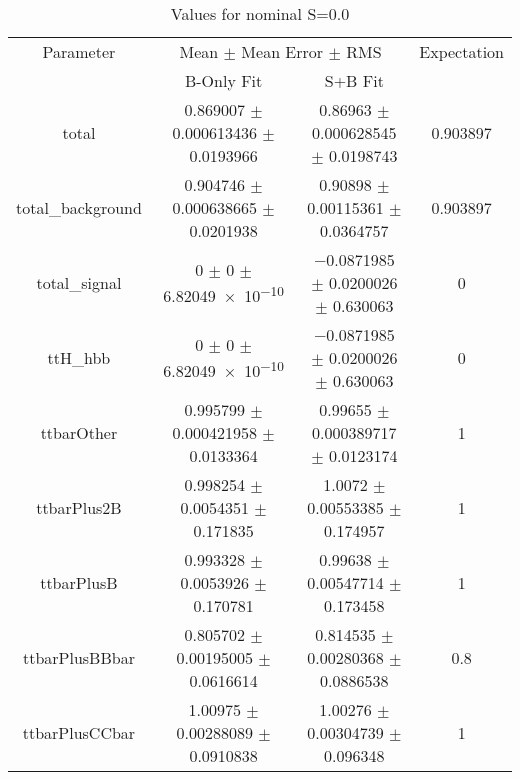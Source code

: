 \begin{table}
\centering
\caption{Values for nominal S=0.0}
\begin{tabular}{cccc}
\toprule
Parameter & \multicolumn{2}{c}{Mean $\pm$ Mean Error $\pm$ RMS} & Expectation\\
 & B-Only Fit & S+B Fit & \\
\midrule
total & \num{0.869007} $\pm$ \num{0.000613436} $\pm$ \num{0.0193966} & \num{0.86963} $\pm$ \num{0.000628545} $\pm$ \num{0.0198743} & \num{0.903897}\\
total\_background & \num{0.904746} $\pm$ \num{0.000638665} $\pm$ \num{0.0201938} & \num{0.90898} $\pm$ \num{0.00115361} $\pm$ \num{0.0364757} & \num{0.903897}\\
total\_signal & \num{0} $\pm$ \num{0} $\pm$ \num{6.82049e-10} & \num{-0.0871985} $\pm$ \num{0.0200026} $\pm$ \num{0.630063} & \num{0}\\
ttH\_hbb & \num{0} $\pm$ \num{0} $\pm$ \num{6.82049e-10} & \num{-0.0871985} $\pm$ \num{0.0200026} $\pm$ \num{0.630063} & \num{0}\\
ttbarOther & \num{0.995799} $\pm$ \num{0.000421958} $\pm$ \num{0.0133364} & \num{0.99655} $\pm$ \num{0.000389717} $\pm$ \num{0.0123174} & \num{1}\\
ttbarPlus2B & \num{0.998254} $\pm$ \num{0.0054351} $\pm$ \num{0.171835} & \num{1.0072} $\pm$ \num{0.00553385} $\pm$ \num{0.174957} & \num{1}\\
ttbarPlusB & \num{0.993328} $\pm$ \num{0.0053926} $\pm$ \num{0.170781} & \num{0.99638} $\pm$ \num{0.00547714} $\pm$ \num{0.173458} & \num{1}\\
ttbarPlusBBbar & \num{0.805702} $\pm$ \num{0.00195005} $\pm$ \num{0.0616614} & \num{0.814535} $\pm$ \num{0.00280368} $\pm$ \num{0.0886538} & \num{0.8}\\
ttbarPlusCCbar & \num{1.00975} $\pm$ \num{0.00288089} $\pm$ \num{0.0910838} & \num{1.00276} $\pm$ \num{0.00304739} $\pm$ \num{0.096348} & \num{1}\\
\bottomrule
\end{tabular}
\end{table}
